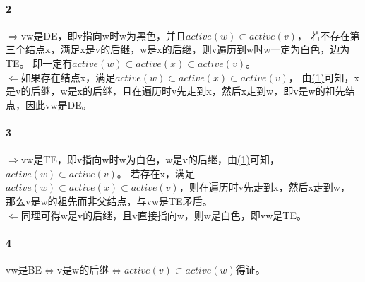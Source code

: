\documentclass[11pt,a4paper,oneside,oldfontcommands]{ctexart}
\begin{document}
\paragraph*{\textcircled{2}}
\textbf{$\Rightarrow$}vw是DE，即v指向w时w为黑色，并且$active(w)\subset active(v)$，
若不存在第三个结点x，满足x是v的后继，w是x的后继，则v遍历到w时w一定为白色，边为TE。
即一定有$active(w)\subset active(x)\subset active(v)$。\\
\hspace*{20pt}\textbf{$\Leftarrow$}如果存在结点x，满足$active(w)\subset active(x)\subset active(v)$，
由\hyperref[(1)]{(1)}可知，x是v的后继，w是x的后继，且在遍历时v先走到x，然后x走到w，即v是w的祖先结点，因此vw是DE。\\
\paragraph*{\textcircled{3}}
\textbf{$\Rightarrow$}vw是TE，即v指向w时w为白色，w是v的后继，由\hyperref[(1)]{(1)}可知，$active(w)\subset active(v)$。
若存在x，满足$active(w)\subset active(x)\subset active(v)$，则在遍历时v先走到x，然后x走到w，
那么v是w的祖先而非父结点，与vw是TE矛盾。\\
\hspace*{20pt}\textbf{$\Leftarrow$}同理可得w是v的后继，且v直接指向w，则w是白色，即vw是TE。\\
\paragraph*{\textcircled{4}}
vw是BE$\Leftrightarrow$v是w的后继$\Leftrightarrow active(v)\subset active(w)$得证。\\
\end{document}
